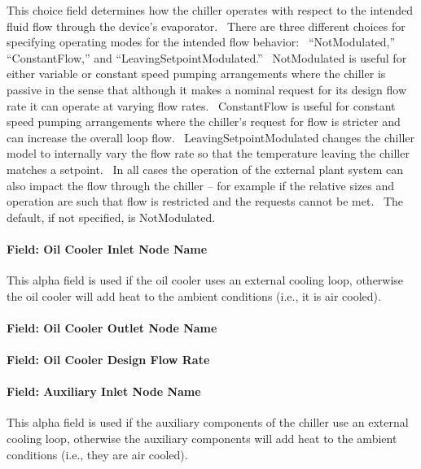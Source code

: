 This choice field determines how the chiller operates with respect to the intended fluid flow through the device's evaporator.~ There are three different choices for specifying operating modes for the intended flow behavior:~ ``NotModulated,'' ``ConstantFlow,'' and ``LeavingSetpointModulated.''~ NotModulated is useful for either variable or constant speed pumping arrangements where the chiller is passive in the sense that although it makes a nominal request for its design flow rate it can operate at varying flow rates.~ ConstantFlow is useful for constant speed pumping arrangements where the chiller's request for flow is stricter and can increase the overall loop flow.~ LeavingSetpointModulated changes the chiller model to internally vary the flow rate so that the temperature leaving the chiller matches a setpoint.~ In all cases the operation of the external plant system can also impact the flow through the chiller -- for example if the relative sizes and operation are such that flow is restricted and the requests cannot be met.~ The default, if not specified, is NotModulated.

\paragraph{Field: Oil Cooler Inlet Node Name}\label{field-chiller205-oil-cooler-inlet-node-name}

This alpha field is used if the oil cooler uses an external cooling loop, otherwise the oil cooler will add heat to the ambient conditions (i.e., it is air cooled).

\paragraph{Field: Oil Cooler Outlet Node Name}\label{field-chiller205-oil-cooler-outlet-node-name}

\paragraph{Field: Oil Cooler Design Flow Rate}\label{field-chiller205-oil-cooler-design-flow-rate}

\paragraph{Field: Auxiliary Inlet Node Name}\label{field-chiller205-auxiliary-inlet-node-name}

This alpha field is used if the auxiliary components of the chiller use an external cooling loop, otherwise the auxiliary components will add heat to the ambient conditions (i.e., they are air cooled).


